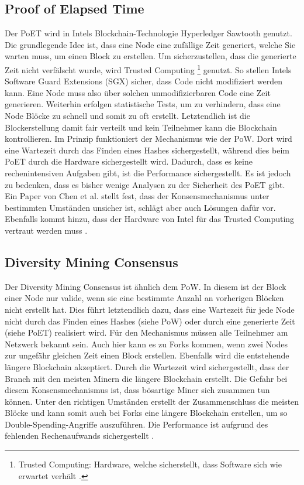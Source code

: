 \subsection{Proof of Elapsed Time}
Der PoET wird in Intels Blockchain-Technologie Hyperledger Sawtooth genutzt. Die grundlegende Idee ist, dass eine Node eine zufällige Zeit generiert, welche Sie warten muss, um einen Block zu erstellen. Um sicherzustellen, dass die generierte Zeit nicht verfälscht wurde, wird Trusted Computing \footnote{Trusted Computing: Hardware, welche sicherstellt, dass Software sich wie erwartet verhält \cite{MitchellTrustedComputing2005}.} genutzt. So stellen Intels Software Guard Extensions (SGX) sicher, dass Code nicht modifiziert werden kann. Eine Node muss also über solchen unmodifizierbaren Code eine Zeit generieren. Weiterhin erfolgen statistische Tests, um zu verhindern, dass eine Node Blöcke zu schnell und somit zu oft erstellt. Letztendlich ist die Blockerstellung damit fair verteilt und kein Teilnehmer kann die Blockchain kontrollieren. Im Prinzip funktioniert der Mechanismus wie der \acs{PoW}. Dort wird eine Wartezeit durch das Finden eines Hashes sichergestellt, während dies beim PoET durch die Hardware sichergestellt wird. Dadurch, dass es keine rechenintensiven Aufgaben gibt, ist die Performance sichergestellt. Es ist jedoch zu bedenken, dass es bisher wenige Analysen zu der Sicherheit des PoET gibt. Ein Paper von Chen et al. stellt fest, dass der Konsensmechanismus unter bestimmten Umständen unsicher ist, schlägt aber auch Lösungen dafür vor. Ebenfalls kommt hinzu, dass der Hardware von Intel für das Trusted Computing vertraut werden muss \cite{ChenSecurityAnalysisProofofElapsedTime2017}.

\subsection{Diversity Mining Consensus}
Der Diversity Mining Consensus ist ähnlich dem \acs{PoW}. In diesem ist der Block einer Node nur valide, wenn sie eine bestimmte Anzahl an vorherigen Blöcken nicht erstellt hat. Dies führt letztendlich dazu, dass eine Wartezeit für jede Node nicht durch das Finden eines Hashes (siehe \acs{PoW}) oder durch eine generierte Zeit (siehe PoET) realisiert wird. Für den Mechanismus müssen alle Teilnehmer am Netzwerk bekannt sein. Auch hier kann es zu Forks kommen, wenn zwei Nodes zur ungefähr gleichen Zeit einen Block erstellen. Ebenfalls wird die entstehende längere Blockchain akzeptiert. Durch die Wartezeit wird sichergestellt, dass der Branch mit den meisten Minern die längere Blockchain erstellt. Die Gefahr bei diesem Konsensmechanismus ist, dass bösartige Miner sich zusammen tun können. Unter den richtigen Umständen erstellt der Zusammenschluss die meisten Blöcke und kann somit auch bei Forks eine längere Blockchain erstellen, um so Double-Spending-Angriffe auszuführen. Die Performance ist aufgrund des fehlenden Rechenaufwands sichergestellt \cite{GreenspanMultiChainPrivateBlockchain2015}\cite{CachinBlockchainConsensusProtocols2017}.

